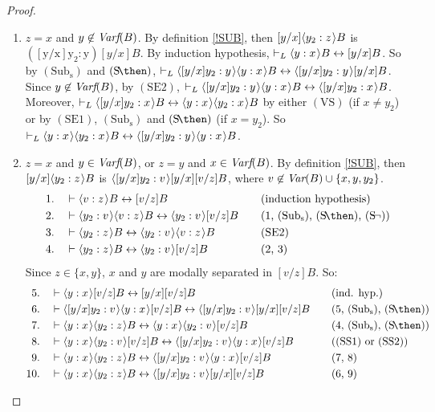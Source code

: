 \documentclass[11pt]{woarticle}
\theoremstyle{break}
\theoremstyle{nonumberplain}
\newcommand{\1}{\;\,|\;\,}
\newcommand{\var}{\emph{Var}}
\newcommand{\fvar}{\emph{Varf}}
\renewcommand{\t}[1]{\ensuremath{\langle #1  \makebox[.2ex]{}\rangle}}
\newcommand{\T}[1]{\ensuremath{(\mathrm{ #1})}}
\begin{document}
\begin{proof}
\begin{enumerate}
\begin{enumerate}
    \item $z=x$ and $y\not\in \fvar(B)$.\; By definition \ref{!SUB},
      then $[y/x]\t{y_2:z}B$ is $\T{[y/x]y_2:y}[y/x]B$. By induction
      hypothesis, $\vdash_L \t{y:x}B \leftrightarrow [y/x]B$. So by
      \T{Sub_s} and \T{S\!\then}, $\vdash_L \t{[y/x]y_2:y}\t{y:x}B
      \leftrightarrow \t{[y/x]y_2:y}[y/x]B$. Since $y\not\in
      \fvar(B)$, by \T{SE2}, $\vdash_L \t{[y/x]y_2:y}\t{y:x}B
      \leftrightarrow \t{[y/x]y_2:x}B$. Moreover, $\vdash_L
      \t{[y/x]y_2:x}B \leftrightarrow \t{y:x}\t{y_2:x}B$ by either
      \T{VS} (if $x\not=y_2$) or by \T{SE1}, \T{Sub_s} and
      \T{S\!\then} (if $x=y_2$). So $\vdash_L \t{y:x}\t{y_2:x}B
      \leftrightarrow \t{[y/x]y_2:y}\t{y:x}B$.
    
    \item $z=x$ and $y\in \fvar(B)$, or $z=y$ and $x\in \fvar(B)$.\;
      By definition \ref{!SUB}, then $[y/x]\t{y_2:z}B$ is
      $\t{[y/x]y_2:v}[y/x][v/z]B$, where $v \not\in \var(B) \cup
      \{x,y,y_2\}$.
      \begin{alignat*}{2}
      1.\quad& \vdash \t{v:z}B \leftrightarrow [v/z]B 
         &\quad&\text{(induction hypothesis)}\\
      2.\quad& \vdash \t{y_2:v}\t{v:z}B \leftrightarrow \t{y_2:v}[v/z]B 
         &\quad&\text{(1, \T{Sub_s}, \T{S\!\then}, \T{S\!\neg})}\\
      3.\quad& \vdash \t{y_2:z}B \leftrightarrow \t{y_2:v}\t{v:z}B
         &\quad& \text{\T{SE2}}\\
      4.\quad& \vdash \t{y_2:z}B \leftrightarrow \t{y_2:v}[v/z]B 
         &\quad&\text{(2, 3)}
      \end{alignat*}
      Since $z\in\{x,y\}$, $x$ and $y$ are modally separated in
      $[v/z]B$. So:
      \begin{alignat*}{2}
      5.\quad& \vdash \t{y:x}[v/z]B \leftrightarrow [y/x][v/z]B
         && \text{(ind. hyp.)}\\
      6.\quad& \vdash \t{[y/x]y_2:v}\t{y:x}[v/z]B \leftrightarrow \t{[y/x]y_2:v}[y/x][v/z]B
         && \text{(5, \T{Sub_s}, \T{S\!\then})}\\
      7.\quad& \vdash \t{y:x}\t{y_2:z}B \leftrightarrow \t{y:x}\t{y_2:v}[v/z]B 
         &\quad& \text{(4, \T{Sub_s}, \T{S\!\then})}\\
      8.\quad& \vdash \t{y:x}\t{y_2:v}[v/z]B \leftrightarrow \t{[y/x]y_2:v}\t{y:x}[v/z]B
         &\quad& \text{(\T{SS1} or \T{SS2})}\\
      9.\quad& \vdash \t{y:x}\t{y_2:z}B \leftrightarrow \t{[y/x]y_2:v}\t{y:x}[v/z]B
         &\quad& \text{(7, 8)}\\
      10.\quad& \vdash \t{y:x}\t{y_2:z}B \leftrightarrow \t{[y/x]y_2:v}[y/x][v/z]B
         && \text{(6, 9)}
       \end{alignat*}
     \end{enumerate}


\end{enumerate}
\end{proof}
\end{document}
